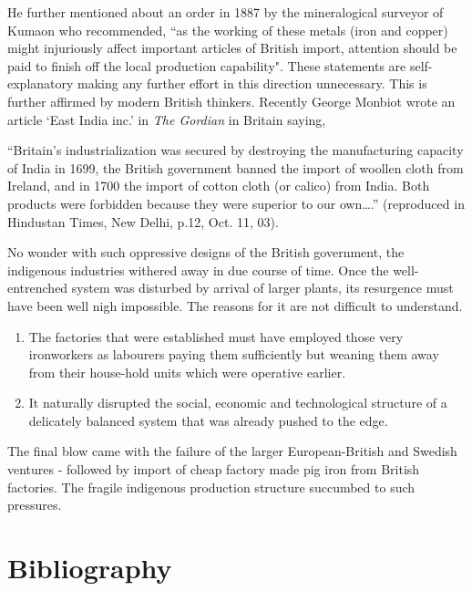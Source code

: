 He further mentioned about an order in 1887 by the mineralogical surveyor of Kumaon who recommended, “as the working of these metals (iron and copper) might injuriously affect important articles of British import, attention should be paid to finish off the local production capability". These statements are self-explanatory making any further effort in this direction unnecessary. This is further affirmed by modern British thinkers. Recently George Monbiot wrote an article ‘East India inc.’ in {\it The Gordian} in Britain saying, 

“Britain’s industrialization was secured by destroying the manufacturing capacity of India in 1699, the British government banned the import of woollen cloth from Ireland, and in 1700 the import of cotton cloth (or calico) from India. Both products were forbidden because they were superior to our own….” (reproduced in Hindustan Times, New Delhi, p.12, Oct. 11, 03). 

No wonder with such oppressive designs of the British government, the indigenous industries withered away in due course of time. Once the well-entrenched system was disturbed by arrival of larger plants, its resurgence must have been well nigh impossible. The reasons for it are not difficult to understand.

\begin{enumerate}
\item The factories that were established must have employed those very ironworkers as labourers paying them sufficiently but weaning them away from their house-hold units which were operative earlier.
\item It naturally disrupted the social, economic and technological structure of a delicately balanced system that was already pushed to the edge.
\end{enumerate}

The final blow came with the failure of the larger European-British and Swedish ventures - followed by import of cheap factory made pig iron from British factories. The fragile indigenous production structure succumbed to such pressures.

\section*{Bibliography}

